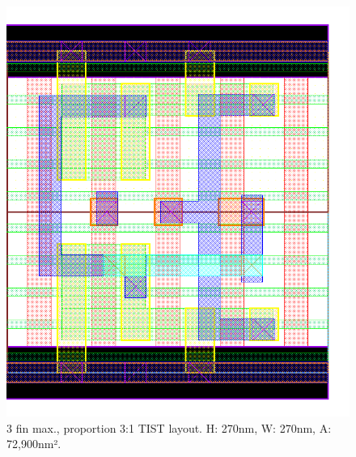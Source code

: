\documentclass[pgmicro,diss,english]{iiufrgs}
\begin{document}
\begin{figure}[]
\centering
\includegraphics[width=\textwidth,height=\textheight,keepaspectratio]{TIST3F1F.png}
\caption{3 fin max., proportion 3:1 TIST layout. H: 270nm, W: 270nm, A: 72,900nm².}
\label{fig:TIST2F}
\end{figure}
\end{document}
